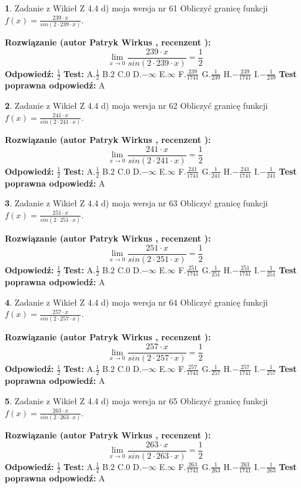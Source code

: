 \documentclass[12pt, a4paper]{article}
\theoremstyle{definition} %
\newtheorem{zad}{}
\newcommand{\zadStart}[1]{\begin{zad}#1\newline}
\newcommand{\zadStop}{\end{zad}}
\newcommand{\rozwStart}[2]{\noindent \textbf{Rozwiązanie (autor #1 , recenzent #2): }\newline}
\newcommand{\rozwStop}{\newline}
\newcommand{\odpStart}{\noindent \textbf{Odpowiedź:}\newline}
\newcommand{\odpStop}{\newline}
\newcommand{\testStart}{\noindent \textbf{Test:}\newline}
\newcommand{\testStop}{\newline}
\newcommand{\kluczStart}{\noindent \textbf{Test poprawna odpowiedź:}\newline}
\newcommand{\kluczStop}{\newline}
\begin{document}
\zadStart{Zadanie z Wikieł Z 4.4 d) moja wersja nr 61}
Obliczyć granicę funkcji $f(x)=\frac{239\cdot x}{sin(2 \cdot239\cdot x)}$.
\zadStop
\rozwStart{Patryk Wirkus}{}
$$\lim\limits_{x\to 0}\frac{239\cdot x}{sin(2 \cdot239\cdot x)}=\frac{1}{2}$$
\rozwStop
\odpStart
$\frac{1}{2}$
\odpStop
\testStart
A.$\frac{1}{2}$
B.$2$
C.$0$
D.$-\infty$
E.$\infty$
F.$\frac{239}{1741}$
G.$\frac{1}{239}$
H.$-\frac{239}{1741}$
I.$-\frac{1}{239}$
\testStop
\kluczStart
A
\kluczStop



\zadStart{Zadanie z Wikieł Z 4.4 d) moja wersja nr 62}
Obliczyć granicę funkcji $f(x)=\frac{241\cdot x}{sin(2 \cdot241\cdot x)}$.
\zadStop
\rozwStart{Patryk Wirkus}{}
$$\lim\limits_{x\to 0}\frac{241\cdot x}{sin(2 \cdot241\cdot x)}=\frac{1}{2}$$
\rozwStop
\odpStart
$\frac{1}{2}$
\odpStop
\testStart
A.$\frac{1}{2}$
B.$2$
C.$0$
D.$-\infty$
E.$\infty$
F.$\frac{241}{1741}$
G.$\frac{1}{241}$
H.$-\frac{241}{1741}$
I.$-\frac{1}{241}$
\testStop
\kluczStart
A
\kluczStop



\zadStart{Zadanie z Wikieł Z 4.4 d) moja wersja nr 63}
Obliczyć granicę funkcji $f(x)=\frac{251\cdot x}{sin(2 \cdot251\cdot x)}$.
\zadStop
\rozwStart{Patryk Wirkus}{}
$$\lim\limits_{x\to 0}\frac{251\cdot x}{sin(2 \cdot251\cdot x)}=\frac{1}{2}$$
\rozwStop
\odpStart
$\frac{1}{2}$
\odpStop
\testStart
A.$\frac{1}{2}$
B.$2$
C.$0$
D.$-\infty$
E.$\infty$
F.$\frac{251}{1741}$
G.$\frac{1}{251}$
H.$-\frac{251}{1741}$
I.$-\frac{1}{251}$
\testStop
\kluczStart
A
\kluczStop



\zadStart{Zadanie z Wikieł Z 4.4 d) moja wersja nr 64}
Obliczyć granicę funkcji $f(x)=\frac{257\cdot x}{sin(2 \cdot257\cdot x)}$.
\zadStop
\rozwStart{Patryk Wirkus}{}
$$\lim\limits_{x\to 0}\frac{257\cdot x}{sin(2 \cdot257\cdot x)}=\frac{1}{2}$$
\rozwStop
\odpStart
$\frac{1}{2}$
\odpStop
\testStart
A.$\frac{1}{2}$
B.$2$
C.$0$
D.$-\infty$
E.$\infty$
F.$\frac{257}{1741}$
G.$\frac{1}{257}$
H.$-\frac{257}{1741}$
I.$-\frac{1}{257}$
\testStop
\kluczStart
A
\kluczStop



\zadStart{Zadanie z Wikieł Z 4.4 d) moja wersja nr 65}
Obliczyć granicę funkcji $f(x)=\frac{263\cdot x}{sin(2 \cdot263\cdot x)}$.
\zadStop
\rozwStart{Patryk Wirkus}{}
$$\lim\limits_{x\to 0}\frac{263\cdot x}{sin(2 \cdot263\cdot x)}=\frac{1}{2}$$
\rozwStop
\odpStart
$\frac{1}{2}$
\odpStop
\testStart
A.$\frac{1}{2}$
B.$2$
C.$0$
D.$-\infty$
E.$\infty$
F.$\frac{263}{1741}$
G.$\frac{1}{263}$
H.$-\frac{263}{1741}$
I.$-\frac{1}{263}$
\testStop
\kluczStart
A
\kluczStop
\end{document}
